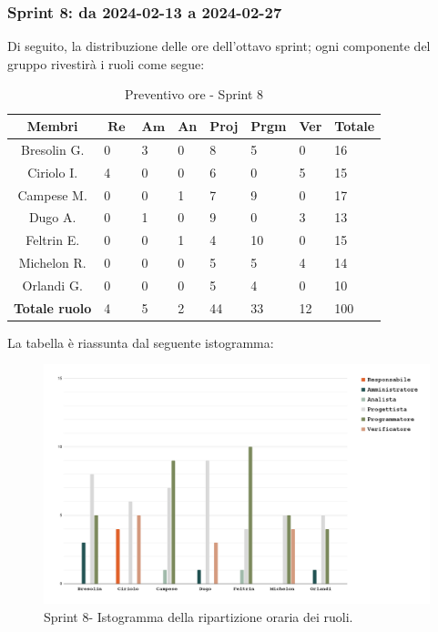 \documentclass[10pt, a4paper]{article}
\begin{document}
{{{{{{{{{{{{{{{\subsubsection{Sprint 8: da 2024-02-13 a 2024-02-27}
Di seguito, la distribuzione delle ore dell'ottavo sprint; ogni componente del gruppo rivestirà i ruoli come segue:
\begin{table}[H]
\begin{tabularx}{\textwidth}{c|X|X|X|X|X|X|X}
    \textbf{Membri} & $\operatorname{\textbf{Re}}$ & $\mathrm{\textbf{Am}}$ & \textbf{An} & \textbf{Proj} & \textbf{Prgm} & \textbf{Ver} & \textbf{Totale} \\
        \hline Bresolin G. & 0 & \cellcolor{primarycolor}3 & 0 & 8 & 5 & 0 & 16 \\
        \hline Ciriolo I.  & \cellcolor{primarycolor}4 & 0 & 0 & 6 & 0 & 5 & 15 \\
        \hline Campese M.  & 0 & 0 & 1 & 7 & \cellcolor{primarycolor}9 & 0 & 17 \\
        \hline Dugo A.     & 0 & 1 & 0 & \cellcolor{primarycolor}9 & 0 & 3 & 13 \\
        \hline Feltrin E.  & 0 & 0 & 1 & 4 & \cellcolor{primarycolor}10 & 0 & 15 \\
        \hline Michelon R. & 0 & 0 & 0 & 5 & 5 & \cellcolor{primarycolor}4 & 14 \\
        \hline Orlandi G.  & 0 & 0 & 0 & \cellcolor{primarycolor}5 & 4 & 0 & 10 \\
        \hline
        \textbf{Totale ruolo} & 4 & 5 & 2 & 44 & 33 & 12 & 100 
    \end{tabularx}
    \caption{Preventivo ore - Sprint 8}
    \end{table}

La tabella è riassunta dal seguente istogramma:
 \begin{figure}[H]
        \centering        
        \includegraphics[width=15.5cm]{istogrammi/istogramma_8_periodo.png}
        \caption{Sprint 8- Istogramma della ripartizione oraria dei ruoli. }
    \end{figure}

}}}}}}}}}}}}}}}
\end{document}
